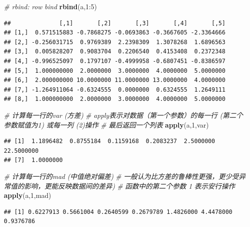 \documentclass[]{article}
\newenvironment{Shaded}{\begin{snugshade}}{\end{snugshade}}
\newcommand{\KeywordTok}[1]{\textcolor[rgb]{0.13,0.29,0.53}{\textbf{{#1}}}}
\newcommand{\DecValTok}[1]{\textcolor[rgb]{0.00,0.00,0.81}{{#1}}}
\newcommand{\CommentTok}[1]{\textcolor[rgb]{0.56,0.35,0.01}{\textit{{#1}}}}
\newcommand{\NormalTok}[1]{{#1}}
\numberwithin{figure}{section}
\numberwithin{table}{section}
\theoremstyle{definition}
\theoremstyle{definition}
\theoremstyle{definition}
\theoremstyle{remark}
\begin{document}
\begin{Shaded}
\begin{Highlighting}[]
\CommentTok{# rbind: row bind}
\KeywordTok{rbind}\NormalTok{(a,}\DecValTok{1}\NormalTok{:}\DecValTok{5}\NormalTok{)}
\end{Highlighting}
\end{Shaded}

\begin{verbatim}
##              [,1]       [,2]       [,3]       [,4]       [,5]
## [1,]  0.571515883 -0.7868275 -0.0693863 -0.3667605 -2.3364666
## [2,] -0.256031715  0.9769389  2.2398309  1.3078268  1.6896563
## [3,]  0.005828207  0.9083704  0.2206540  0.4153408  0.2372348
## [4,] -0.996525097  0.1797107 -0.4999958 -0.6807451 -0.8386597
## [5,]  1.000000000  2.0000000  3.0000000  4.0000000  5.0000000
## [6,]  2.000000000 10.0000000 11.0000000 13.0000000  4.0000000
## [7,] -1.264911064 -0.6324555  0.0000000  0.6324555  1.2649111
## [8,]  1.000000000  2.0000000  3.0000000  4.0000000  5.0000000
\end{verbatim}

\begin{Shaded}
\begin{Highlighting}[]
\CommentTok{# 计算每一行的var (方差)}
\CommentTok{# apply表示对数据（第一个参数）的每一行 (第二个参数赋值为1) 或每一列 (2)操作}
\CommentTok{#      最后返回一个列表}
\KeywordTok{apply}\NormalTok{(a,}\DecValTok{1}\NormalTok{,var)}
\end{Highlighting}
\end{Shaded}

\begin{verbatim}
## [1]  1.1896482  0.8755184  0.1159168  0.2083237  2.5000000 22.5000000
## [7]  1.0000000
\end{verbatim}

\begin{Shaded}
\begin{Highlighting}[]
\CommentTok{# 计算每一行的mad (中值绝对偏差)}
\CommentTok{# 一般认为比方差的鲁棒性更强，更少受异常值的影响，更能反映数据间的差异)}
\CommentTok{# 函数中的第二个参数 1 表示安行操作}
\KeywordTok{apply}\NormalTok{(a,}\DecValTok{1}\NormalTok{,mad)}
\end{Highlighting}
\end{Shaded}

\begin{verbatim}
## [1] 0.6227913 0.5661004 0.2640599 0.2679789 1.4826000 4.4478000 0.9376786
\end{verbatim}
\end{document}

